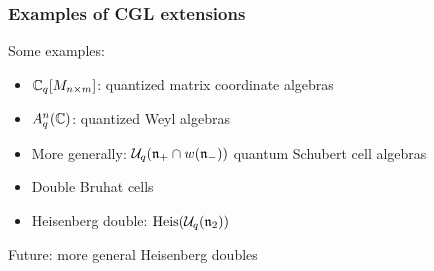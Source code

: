 \documentclass[aspectratio=169]{beamer}
\begin{document}
\begin{frame}
	\frametitle{Examples of CGL extensions}

	Some examples:
	\begin{itemize}
		\item $\mathbb{C}_q[M_{n\times m}]$: quantized matrix coordinate algebras
		\item $A^n_q(\mathbb{C})$: quantized Weyl algebras
		\item More generally: $\mathcal{U}_q(\mathfrak{n}_+ \cap w(\mathfrak{n}_-))$ quantum Schubert cell algebras
		\item Double Bruhat cells \pause
		\item Heisenberg double: $\operatorname{Heis}(\mathcal{U}_q(\mathfrak{n}_2))$
	\end{itemize}
	\medskip
	\pause
	Future: more general Heisenberg doubles

\end{frame}


\end{document}
